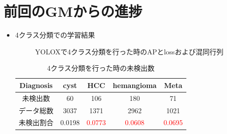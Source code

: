 \documentclass[a4j]{ujarticle}
\begin{document}
\clearpage

    \section{前回のGMからの進捗}
        \begin{itemize}
            \item 4クラス分類での学習結果

            \begin{figure}[h]
                \centering
                \caption{YOLOX\cite{yolox}で4クラス分類を行った時のAPとlossおよび混同行列}
            \end{figure}

            \begin{table}[h]
                \centering
                \caption{4クラス分類を行った時の未検出数}
                \label{tab:undetected}
                \begin{tabular}{c|cccc}
                    Diagnosis & cyst & HCC & hemangioma & Meta \\ \hline
                    未検出数 & 60 & 106 & 180 & 71 \\
                    データ総数 & 3037 & 1371 & 2962 & 1021 \\ \hline
                    未検出割合 & 0.0198 & \textcolor{red}{0.0773} & \textcolor{red}{0.0608} & \textcolor{red}{0.0695}
                \end{tabular}
            \end{table}


\end{itemize}
\end{document}
